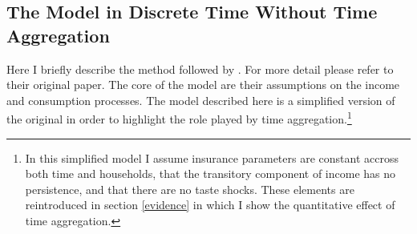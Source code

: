 \subsection{The Model in Discrete Time Without Time Aggregation}
Here I briefly describe the method followed by \cite{blundell_consumption_2008}. For more detail please refer to their original paper. The core of the model are their assumptions on the income and consumption processes. The model described here is a simplified version of the original in order to highlight the role played by time aggregation.\footnote{In this simplified model I assume insurance parameters are constant accross both time and households, that the transitory component of income has no persistence, and that there are no taste shocks. These elements are reintroduced in section \ref{evidence} in which I show the quantitative effect of time aggregation.} 

